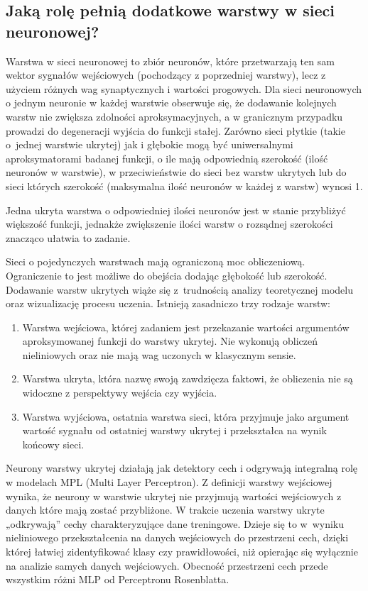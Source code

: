 \subsection{Jaką rolę pełnią dodatkowe warstwy w sieci neuronowej?}

Warstwa w sieci neuronowej to zbiór neuronów, które przetwarzają ten sam wektor sygnałów wejściowych (pochodzący z poprzedniej warstwy), lecz z użyciem różnych wag synaptycznych i wartości progowych. 
Dla sieci neuronowych o jednym neuronie w każdej warstwie obserwuje się, że dodawanie kolejnych warstw nie zwiększa zdolności aproksymacyjnych, a w granicznym przypadku prowadzi do degeneracji wyjścia do funkcji stałej.
Zarówno sieci płytkie (takie o~jednej warstwie ukrytej) jak i głębokie mogą być uniwersalnymi aproksymatorami badanej funkcji, o ile mają odpowiednią szerokość (ilość neuronów w warstwie), w przeciwieństwie do sieci bez warstw ukrytych lub do sieci których szerokość (maksymalna ilość neuronów w każdej z warstw) wynosi 1.\cite{tutorial_nn_activation}

Jedna ukryta warstwa o odpowiedniej ilości neuronów jest w stanie przybliżyć większość funkcji, jednakże zwiększenie ilości warstw o rozsądnej szerokości znacząco ułatwia to zadanie. \cite{islp}

Sieci o pojedynczych warstwach mają ograniczoną moc obliczeniową. Ograniczenie to jest możliwe do obejścia dodając głębokość lub szerokość.
Dodawanie warstw ukrytych wiąże się z~trudnością analizy teoretycznej modelu oraz wizualizację procesu uczenia.
Istnieją zasadniczo trzy rodzaje warstw:
\begin{enumerate}
    \item Warstwa wejściowa, której zadaniem jest przekazanie wartości argumentów aproksymowanej funkcji do warstwy ukrytej. Nie wykonują obliczeń nieliniowych oraz nie mają wag uczonych w klasycznym sensie.
    \item Warstwa ukryta, która nazwę swoją zawdzięcza faktowi, że obliczenia nie są widoczne z perspektywy wejścia czy wyjścia. 
    \item Warstwa wyjściowa, ostatnia warstwa sieci, która przyjmuje jako argument wartość sygnału od ostatniej warstwy ukrytej i przekształca na wynik końcowy sieci.
\end{enumerate}

Neurony warstwy ukrytej działają jak detektory cech i odgrywają integralną rolę w modelach MPL (Multi Layer Perceptron). Z definicji warstwy wejściowej wynika, że neurony w warstwie ukrytej nie przyjmują wartości wejściowych z danych które mają zostać przybliżone. W trakcie uczenia warstwy ukryte „odkrywają” cechy charakteryzujące dane treningowe. Dzieje się to w~wyniku nieliniowego przekształcenia na danych wejściowych do przestrzeni cech, dzięki której łatwiej zidentyfikować klasy czy prawidłowości, niż opierając się wyłącznie na analizie samych danych wejściowych. Obecność przestrzeni cech przede wszystkim różni MLP od Perceptronu Rosenblatta.

